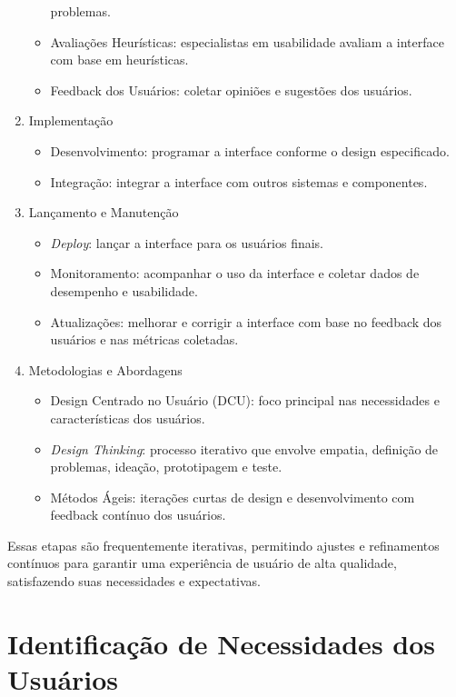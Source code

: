 \documentclass[
  12pt,
  openright,
  twoside,
  a4paper,
  english,
  french,
  spanish,
  brazil
]{abntex2}
\begin{document}
\begin{enumerate}
\begin{itemize}
      problemas.
    \item
      Avaliações Heurísticas: especialistas em usabilidade avaliam a interface
      com base em heurísticas.
    \item Feedback dos Usuários: coletar opiniões e sugestões dos usuários.
  \end{itemize}
  \item Implementação
  \begin{itemize}
    \item Desenvolvimento: programar a interface conforme o design especificado.
    \item Integração: integrar a interface com outros sistemas e componentes.
  \end{itemize}
  \item Lançamento e Manutenção
  \begin{itemize}
    \item \textit{Deploy}: lançar a interface para os usuários finais.
    \item
      Monitoramento: acompanhar o uso da interface e coletar dados de desempenho
      e usabilidade.
    \item
      Atualizações: melhorar e corrigir a interface com base no feedback dos
      usuários e nas métricas coletadas.
  \end{itemize}
  \item Metodologias e Abordagens
  \begin{itemize}
    \item
      Design Centrado no Usuário (DCU): foco principal nas necessidades e
      características dos usuários.
    \item
      \textit{Design Thinking}: processo iterativo que envolve empatia,
      definição de problemas, ideação, prototipagem e teste.
    \item
      Métodos Ágeis: iterações curtas de design e desenvolvimento com feedback
      contínuo dos usuários.
  \end{itemize}
\end{enumerate}

Essas etapas são frequentemente iterativas, permitindo ajustes e refinamentos
contínuos para garantir uma experiência de usuário de alta qualidade,
satisfazendo suas necessidades e expectativas.

\section{Identificação de Necessidades dos Usuários}
\end{document}
